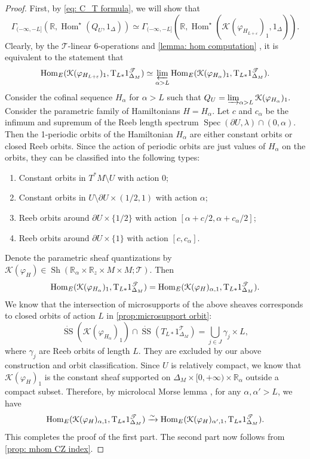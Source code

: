 \documentclass[11pt]{amsart}
\numberwithin{equation}{section}
\theoremstyle{plain}
\theoremstyle{definition}
\theoremstyle{remark}
\newcommand{\bR} { {\mathbb{R}}}
\newcommand{\cK} { {\mathcal{K}}}
\newcommand{\sT} { {\mathscr{T}}}
\newcommand{\Sh} { {\operatorname{Sh}}}
\newcommand\Hom{\operatorname{Hom}}
\newcommand\ms{\operatorname{SS}}
\newcommand\Spec{\operatorname{Spec}}
\newcommand\nT{ {\textnormal{T}} }
\begin{document}
\begin{proof}
First, by \autoref{eq: C_T formula}, we will show that 
\[\Gamma_{(-\infty,-L]}(\bR, \Hom^\star(Q_U, 1_\Delta)) \simeq \Gamma_{(-\infty,-L]}(\bR, \Hom^\star(\cK(\varphi_{H_{L+\varepsilon}})_1, 1_\Delta)).\]
Clearly, by the $\sT$-linear 6-operations and \autoref{lemma: hom computation} \cite[Proposition 7.6]{Hochschild-Kuo-Shende-Zhang}, it is equivalent to the statement that
\[\Hom_{E}(\cK(\varphi_{H_{L+\varepsilon}})_1,\nT_{L*}1^\sT_{\Delta_M}) \simeq \varprojlim_{\alpha>L}\Hom_{E}(\cK(\varphi_{H_{\alpha}})_1,\nT_{L*}1^\sT_{\Delta_M}).\]
Consider the cofinal sequence $H_{\alpha}$ for $\alpha>L$ such that
$Q_U = \varinjlim_{\alpha>L} \cK(\varphi_{H_{\alpha}})_1.$
Consider the parametric family of Hamiltonians $H = H_\alpha$.
Let $c$ and $c_\alpha$ be the infimum and supremum of the Reeb length spectrum $\Spec(\partial U, \lambda) \cap (0, \alpha)$. Then the 1-periodic orbits of the Hamiltonian $H_{\alpha}$ are either constant orbits or closed Reeb orbits. Since the action of periodic orbits are just values of $H_\alpha$ on the orbits, they can be classified into the following types:
\begin{enumerate}
    \item Constant orbits in $T^*M \setminus U$ with action $0$;
    \item Constant orbits in $U \setminus \partial U \times (1/2, 1)$ with action $\alpha$;
    \item Reeb orbits around $\partial U \times \{1/2\}$ with action $[\alpha + c/2, \alpha + c_\alpha/2]$;
    \item Reeb orbits around $\partial U \times \{1\}$ with action $[c, c_\alpha]$.
\end{enumerate}
Denote the parametric sheaf quantizations by $\cK(\varphi_H) \in \Sh(\bR_\alpha \times \bR_z \times M \times M; \sT)$. Then 
\[ \Hom_E(\cK(\varphi_{H_{\alpha}})_1,\nT_{L*}1^\sT_{\Delta_M})= \Hom_E(\cK(\varphi_{H})_{\alpha,1},\nT_{L*}1^\sT_{\Delta_M}).\]
We know that the intersection of microsupports of the above sheaves corresponds to closed orbits of action $L$ in \autoref{prop:microsupport orbit}:
\[\dot{\ms}(\cK(\varphi_{H_\alpha})_1) \cap \dot{\ms}(T_{L*}1_{\Delta_M}^\sT) = \bigcup_{j\in J}\gamma_j \times L,\]
where $\gamma_j$ are Reeb orbits of length $L$. They are excluded by our above construction and orbit classification. Since $U$ is relatively compact, we know that $\cK(\varphi_{H})_{1}$ is the constant sheaf supported on $\Delta_M \times [0, +\infty) \times \bR_\alpha$ outside a compact subset. Therefore, by microlocal Morse lemma \cite[Proposition 5.4.19]{KS90}, for any $\alpha, \alpha' > L$, we have
\[\Hom_{E}(\cK(\varphi_{H})_{\alpha,1},\nT_{L*}1^\sT_{\Delta_M}) \xrightarrow{\sim} \Hom_{E}(\cK(\varphi_{H})_{\alpha',1},\nT_{L*}1^\sT_{\Delta_M}).\]
This completes the proof of the first part. The second part now follows from \autoref{prop: mhom CZ index}.
\end{proof}
\end{document}
